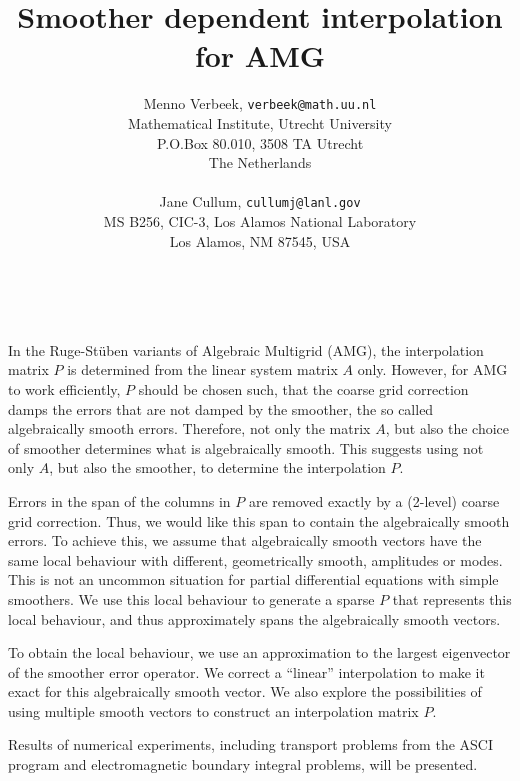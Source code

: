 \documentclass[11pt]{article}
\date{ ~ \hspace{-4mm}}
\title{Smoother dependent interpolation for AMG  }
\author{Menno Verbeek, {\tt verbeek@math.uu.nl} \\ Mathematical Institute, Utrecht University \\ P.O.Box 80.010, 3508 TA Utrecht \\ The Netherlands \\ \\ Jane Cullum, {\tt cullumj@lanl.gov} \\ MS B256, CIC-3, Los Alamos National Laboratory \\ Los Alamos, NM 87545, USA}
\begin{document}
\maketitle
\thispagestyle{empty}






In the Ruge-St\"{u}ben variants of Algebraic Multigrid (AMG), the
interpolation matrix $P$ is determined from the linear system
matrix $A$ only. However, for AMG to work efficiently, $P$
should be chosen such, that the coarse grid correction damps the
errors that are not damped by the smoother, the so called
algebraically smooth errors. Therefore, not only the matrix $A$, but also
the choice of smoother determines what is algebraically smooth. This suggests
using not only $A$, but also the smoother, to determine the
interpolation $P$.




Errors in the span of the columns in $P$ are removed exactly by
a (2-level) coarse grid correction. Thus, we would like this span to
contain the algebraically smooth errors. To
achieve this, we assume that algebraically smooth vectors have the
same local behaviour with different, geometrically smooth, amplitudes
or modes. This is not an uncommon situation for partial differential
equations with simple smoothers. We use this local behaviour to
generate a sparse $P$ that represents this local behaviour, and
thus approximately spans the algebraically smooth vectors.




To obtain the local behaviour, we use an approximation to the
largest eigenvector of the smoother error operator.  We correct a
``linear'' interpolation to make it exact for this algebraically smooth
vector. We also explore the possibilities of using multiple smooth
vectors to construct an interpolation matrix $P$.




Results of numerical experiments, including transport
problems from the ASCI program and electromagnetic boundary integral
problems, will be presented.
\end{document}
